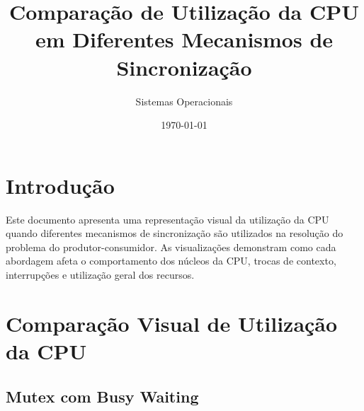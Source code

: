 \documentclass[12pt]{article}
\title{Comparação de Utilização da CPU em Diferentes Mecanismos de Sincronização}
\author{Sistemas Operacionais}
\date{\today}
\begin{document}
\maketitle

\section{Introdução}

Este documento apresenta uma representação visual da utilização da CPU quando diferentes mecanismos de sincronização são utilizados na resolução do problema do produtor-consumidor. As visualizações demonstram como cada abordagem afeta o comportamento dos núcleos da CPU, trocas de contexto, interrupções e utilização geral dos recursos.

\section{Comparação Visual de Utilização da CPU}

\subsection{Mutex com Busy Waiting}
\end{document}
